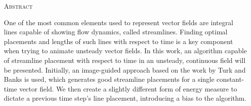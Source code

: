 
\begin{center}
  \textsc{Abstract}
\end{center}
%
\noindent
One of the most common elements used to represent vector fields are integral lines capable of showing flow dynamics, called streamlines.
Finding optimal placements and lengths of such lines with respect to time is a key component when trying to animate unsteady vector fields.
In this work, an algorithm capable of streamline placement with respect to time in an unsteady, continuous field will be presented.
Initially, an image-guided approach based on the work by Turk and Banks is used, which generates good streamline placements for a single constant-time vector field.
We then create a slightly different form of energy measure to dictate a previous time step's line placement, introducing a bias to the algorithm.
\cleardoublepage

